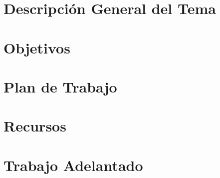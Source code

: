 \documentclass[letter, 10pt]{article}
\begin{document}


\section{Descripción General del Tema}


\section{Objetivos}



\section{Plan de Trabajo}


\section{Recursos}


\section{Trabajo Adelantado}


\newpage

\end{document}
